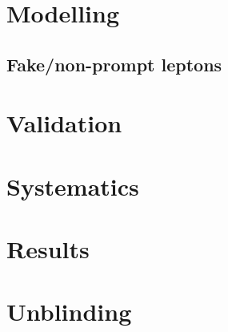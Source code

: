 \section{Modelling}

\subsection{Fake/non-prompt leptons}
\label{sec:2ljets_mm_fakes}

\section{Validation}

\section{Systematics}

\section{Results}

\section{Unblinding}
